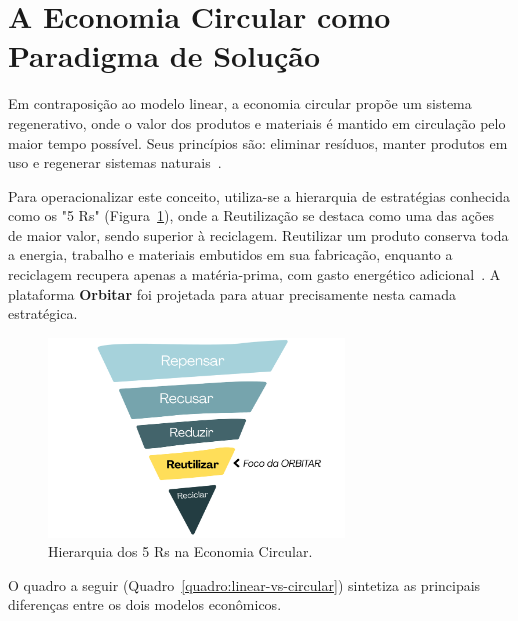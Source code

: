 \documentclass[
	12pt,				%
	openright,			%
	oneside,			%
	a4paper,			%
	english,			%
	brazil				%
	]{abntex2}
\theoremstyle{definition}
\begin{document}
\section{A Economia Circular como Paradigma de Solução}

Em contraposição ao modelo linear, a economia circular propõe um sistema regenerativo, onde o valor dos produtos e materiais é mantido em circulação pelo maior tempo possível. Seus princípios são: eliminar resíduos, manter produtos em uso e regenerar sistemas naturais~\cite{EMF2013}.

Para operacionalizar este conceito, utiliza-se a hierarquia de estratégias conhecida como os "5 Rs" (Figura~\ref{fig:hierarquia-5Rs}), onde a Reutilização se destaca como uma das ações de maior valor, sendo superior à reciclagem. Reutilizar um produto conserva toda a energia, trabalho e materiais embutidos em sua fabricação, enquanto a reciclagem recupera apenas a matéria-prima, com gasto energético adicional~\cite{Kirchherr2017}. A plataforma \textbf{Orbitar} foi projetada para atuar precisamente nesta camada estratégica.

\begin{figure}[H] %
    \centering
    \includegraphics[width=0.7\textwidth]{imagens/hierarquia_5Rs.png}
    \caption{Hierarquia dos 5 Rs na Economia Circular.}
    \label{fig:hierarquia-5Rs}
\end{figure}

O quadro a seguir (Quadro~\ref{quadro:linear-vs-circular}) sintetiza as principais diferenças entre os dois modelos econômicos.
\end{document}
